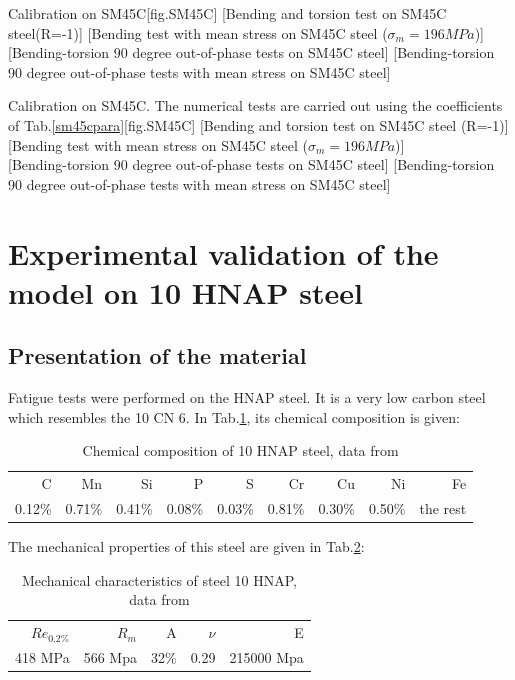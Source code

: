 \begin{Figure}[!h]{Calibration on  SM45C}[fig.SM45C]
	[Bending and torsion test on SM45C steel(R=-1)]
	[Bending test with mean stress on SM45C steel ($\sigma_m=196 MPa$)]
	\\
	[Bending-torsion 90 degree out-of-phase tests on SM45C steel]
	[Bending-torsion 90 degree out-of-phase tests with mean stress on SM45C steel]
\end{Figure}

\begin{Figure}[!h]{Calibration on  SM45C. The numerical tests are carried out using the coefficients of Tab.\ref{sm45cpara}}[fig.SM45C]
[Bending and torsion test on SM45C steel (R=-1)]
[Bending test with mean stress on SM45C steel ($\sigma_m=196 MPa$)]
\\
[Bending-torsion 90 degree out-of-phase tests on SM45C steel]
[Bending-torsion 90 degree out-of-phase tests with mean stress on SM45C steel]
\end{Figure}


\clearpage
\section{Experimental validation of the model on 10 HNAP steel}
\subsection{Presentation of the material}
Fatigue tests were performed on the HNAP steel. It is a very low carbon steel
which resembles the 10 CN 6. In Tab.\ref{tab.10HNAPchem}, its chemical composition is given:	
\begin{table}[!h]
\centering
\begin{tabular}{rrrrrrrrr}
\hline
C      & Mn     & Si     & P      & S      & Cr     & Cu     & Ni     & Fe       \\
0.12\% & 0.71\% & 0.41\% & 0.08\% & 0.03\% & 0.81\% & 0.30\% & 0.50\% & the rest \\ \hline
\end{tabular}
\caption{Chemical composition of 10 HNAP steel, data from \cite{Bedkowski1994}}
\label{tab.10HNAPchem}
\end{table}
The mechanical properties of this steel are given in Tab.\ref{tab.10HNAPmec}:
\begin{table}[!h]
\centering
\begin{tabular}{rrrrr}
\hline
$Re_{0.2\%}$ & $R_m$   & A    & $\nu$ & E          \\
418 MPa     & 566 Mpa & 32\% & 0.29  & 215000 Mpa \\ \hline
\end{tabular}
\caption{Mechanical characteristics of steel 10 HNAP, data from \cite{Bedkowski1994}}
\label{tab.10HNAPmec}
\end{table}


